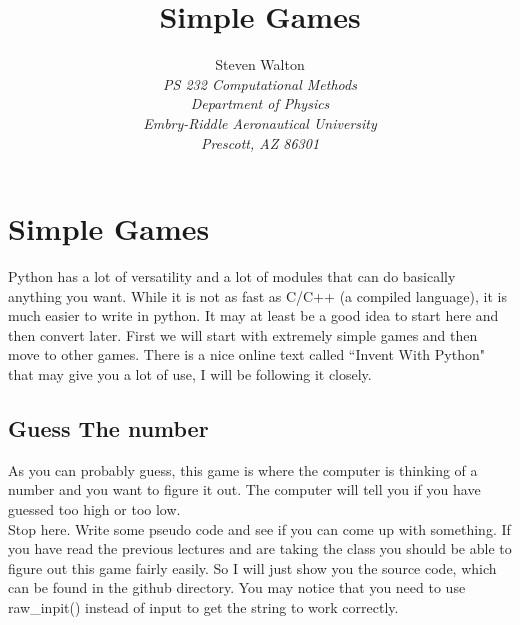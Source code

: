 \documentclass[11pt]{article}   %
\title{Simple Games}
\author{Steven Walton\\     %
\textit{PS 232 Computational Methods}\\
\textit{Department of Physics}\\
\textit{Embry-Riddle Aeronautical University}\\
\textit{Prescott, AZ   86301}}
\begin{document}
\maketitle
\section*{Simple Games}
Python has a lot of versatility and a lot of modules that can do basically anything you want.  While it is not as fast as C/C++ (a compiled language), it is much easier to write in python.  It may at least be a good idea to 
start here and then convert later.  First we will start with extremely simple games and then move to other games.  There is a nice online text called ``Invent With Python" that may give you a lot of use, I will be following it
closely.

\subsection*{Guess The number}
As you can probably guess, this game is where the computer is thinking of a number and you want to figure it out.  The computer will tell you if you have guessed too high or too low.
\\
Stop here.  Write some pseudo code and see if you can come up with something.  If you have read the previous lectures and are taking the class you should be able to figure out this game fairly easily.  So I will just show you the 
source code, which can be found in the github directory.  You may notice that you need to use raw_inpit() instead of input to get the string to work correctly.
\end{document}
